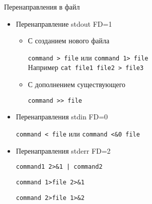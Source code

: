 \begin{frame}{Перенаправления в файл}

\begin{itemize}
  \item Перенаправление \alert{stdout FD=1}
    \begin{itemize}
      \item С созданием нового файла

        {\tt command > file} или {\tt command 1> file}\\
		Например {\tt cat file1 file2 > file3}
      \item С дополнением существующего

		  {\tt command >\phantom{}>  file}
    \end{itemize}
    \pause
  \item Перенаправления  \alert{stdin FD=0}

    {\tt command < file} или  {\tt command <\&0 file}
    \pause
  \item Перенаправления \alert{stderr FD=2}

    {\tt command1 2>\&1 | command2}

   {\tt command 1>file 2>\&1}

   {\tt command 2>file 1>\&2}
\end{itemize}

\end{frame}
